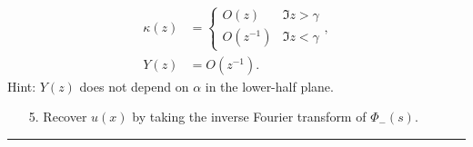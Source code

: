\documentclass[12pt,a4paper]{article}
\begin{document}
\begin{align*}
 \kappa(z) & =  \begin{cases}  O(z) & \Im z > \gamma \\
                          O(z^{-1}) &  \Im z < \gamma \end{cases},\\
Y(z) & =  O(z^{-1}).
\end{align*}
Hint: $Y(z)$ does not depend on $\alpha$ in the lower-half plane.

\begin{itemize}
\item[5. ] Recover $u(x)$ by taking the inverse Fourier transform of $\Phi_-(s)$.

\end{itemize}
\rule{\textwidth}{1pt}
\end{document}
